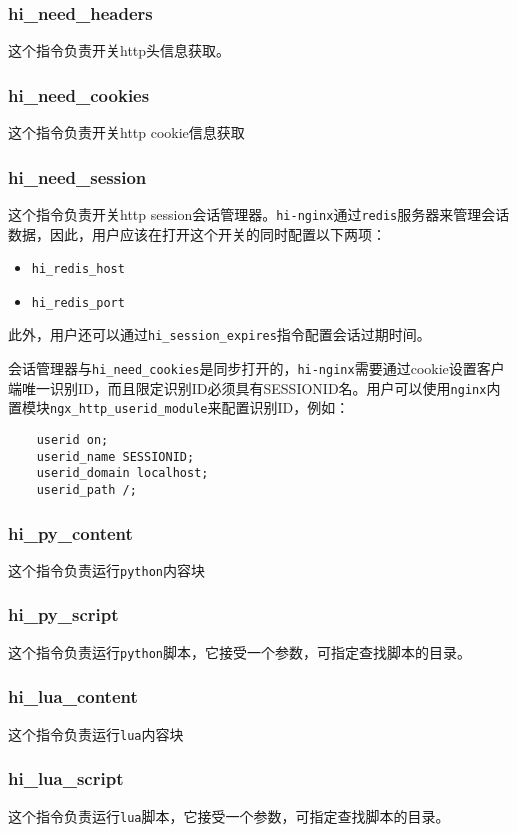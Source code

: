 \subsubsection{hi_need_headers}
这个指令负责开关http头信息获取。
\subsubsection{hi_need_cookies}
这个指令负责开关http cookie信息获取
\subsubsection{hi_need_session}
这个指令负责开关http session会话管理器。\texttt{hi-nginx}通过\texttt{redis}服务器来管理会话数据，因此，用户应该在打开这个开关的同时配置以下两项：
\begin{itemize}
\item \texttt{hi_redis_host}
\item \texttt{hi_redis_port}
\end{itemize}
此外，用户还可以通过\texttt{hi_session_expires}指令配置会话过期时间。

会话管理器与\texttt{hi_need_cookies}是同步打开的，\texttt{hi-nginx}需要通过cookie设置客户端唯一识别ID，而且限定识别ID必须具有SESSIONID名。用户可以使用\texttt{nginx}内置模块\texttt{ngx_http_userid_module}来配置识别ID，例如：
\begin{lstlisting}
	userid on;
	userid_name SESSIONID;
	userid_domain localhost;
	userid_path /;
\end{lstlisting}
\subsubsection{hi_py_content}
这个指令负责运行\texttt{python}内容块
\subsubsection{hi_py_script}
这个指令负责运行\texttt{python}脚本，它接受一个参数，可指定查找脚本的目录。
\subsubsection{hi_lua_content}
这个指令负责运行\texttt{lua}内容块
\subsubsection{hi_lua_script}
这个指令负责运行\texttt{lua}脚本，它接受一个参数，可指定查找脚本的目录。








